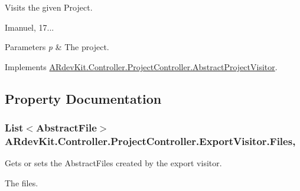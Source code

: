 Visits the given Project. 

Imanuel, 17... 


\begin{DoxyParams}{Parameters}
{\em p} & The project. \\
\hline
\end{DoxyParams}


Implements \hyperlink{class_a_rdev_kit_1_1_controller_1_1_project_controller_1_1_abstract_project_visitor_a6f3a8879b50f53e1d25fc87c588a59fa}{A\-Rdev\-Kit.\-Controller.\-Project\-Controller.\-Abstract\-Project\-Visitor}.



\subsection{Property Documentation}
\hypertarget{class_a_rdev_kit_1_1_controller_1_1_project_controller_1_1_export_visitor_ac241f50a7b72f0cf3dc5b77c42a6a71b}{
\subsubsection[{Files}]{\setlength{\rightskip}{0pt plus 5cm}List$<${\bf Abstract\-File}$>$ A\-Rdev\-Kit.\-Controller.\-Project\-Controller.\-Export\-Visitor.\-Files\hspace{0.3cm}{\ttfamily [get]}, {\ttfamily [set]}}}\label{class_a_rdev_kit_1_1_controller_1_1_project_controller_1_1_export_visitor_ac241f50a7b72f0cf3dc5b77c42a6a71b}


Gets or sets the Abstract\-Files created by the export visitor. 

The files. 